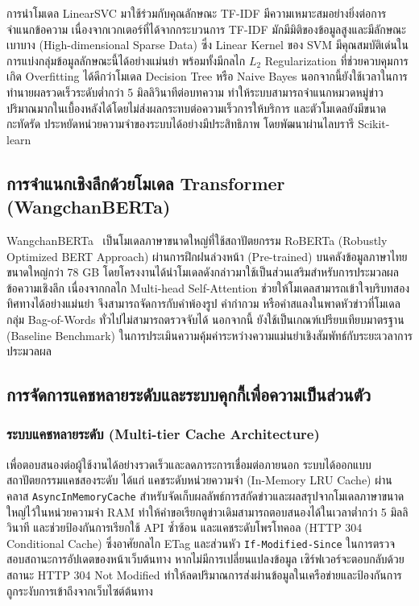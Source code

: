 การนำโมเดล LinearSVC มาใช้ร่วมกับคุณลักษณะ TF-IDF มีความเหมาะสมอย่างยิ่งต่อการจำแนกข้อความ เนื่องจากเวกเตอร์ที่ได้จากกระบวนการ TF-IDF มักมีมิติของข้อมูลสูงและมีลักษณะเบาบาง (High-dimensional Sparse Data) ซึ่ง Linear Kernel ของ SVM มีคุณสมบัติเด่นในการแบ่งกลุ่มข้อมูลลักษณะนี้ได้อย่างแม่นยำ พร้อมทั้งมีกลไก $L_2$ Regularization ที่ช่วยควบคุมการเกิด Overfitting ได้ดีกว่าโมเดล Decision Tree หรือ Naive Bayes นอกจากนี้ยังใช้เวลาในการทำนายผลรวดเร็วระดับต่ำกว่า 5 มิลลิวินาทีต่อบทความ ทำให้ระบบสามารถจำแนกหมวดหมู่ข่าวปริมาณมากในเบื้องหลังได้โดยไม่ส่งผลกระทบต่อความเร็วการให้บริการ และตัวโมเดลยังมีขนาดกะทัดรัด ประหยัดหน่วยความจำของระบบได้อย่างมีประสิทธิภาพ โดยพัฒนาผ่านไลบรารี Scikit-learn~\parencite{scikit2024}

\subsection{การจำแนกเชิงลึกด้วยโมเดล Transformer (WangchanBERTa)}

WangchanBERTa~\parencite{wangchanberta2021} เป็นโมเดลภาษาขนาดใหญ่ที่ใช้สถาปัตยกรรม RoBERTa (Robustly Optimized BERT Approach) ผ่านการฝึกฝนล่วงหน้า (Pre-trained) บนคลังข้อมูลภาษาไทยขนาดใหญ่กว่า 78 GB โดยโครงงานได้นำโมเดลดังกล่าวมาใช้เป็นส่วนเสริมสำหรับการประมวลผลข้อความเชิงลึก เนื่องจากกลไก Multi-head Self-Attention ช่วยให้โมเดลสามารถเข้าใจบริบทสองทิศทางได้อย่างแม่นยำ จึงสามารถจัดการกับคำพ้องรูป คำกำกวม หรือคำสแลงในพาดหัวข่าวที่โมเดลกลุ่ม Bag-of-Words ทั่วไปไม่สามารถตรวจจับได้ นอกจากนี้ ยังใช้เป็นเกณฑ์เปรียบเทียบมาตรฐาน (Baseline Benchmark) ในการประเมินความคุ้มค่าระหว่างความแม่นยำเชิงสัมพัทธ์กับระยะเวลาการประมวลผล

\subsection{การจัดการแคชหลายระดับและระบบคุกกี้เพื่อความเป็นส่วนตัว}

\subsubsection{ระบบแคชหลายระดับ (Multi-tier Cache Architecture)}
เพื่อตอบสนองต่อผู้ใช้งานได้อย่างรวดเร็วและลดภาระการเชื่อมต่อภายนอก ระบบได้ออกแบบสถาปัตยกรรมแคชสองระดับ ได้แก่ แคชระดับหน่วยความจำ (In-Memory LRU Cache) ผ่านคลาส \texttt{AsyncInMemoryCache} สำหรับจัดเก็บผลลัพธ์การสกัดข่าวและผลสรุปจากโมเดลภาษาขนาดใหญ่ไว้ในหน่วยความจำ RAM ทำให้คำขอเรียกดูข่าวเดิมสามารถตอบสนองได้ในเวลาต่ำกว่า 5 มิลลิวินาที และช่วยป้องกันการเรียกใช้ API ซ้ำซ้อน และแคชระดับโพรโทคอล (HTTP 304 Conditional Cache) ซึ่งอาศัยกลไก ETag และส่วนหัว \texttt{If-Modified-Since} ในการตรวจสอบสถานะการอัปเดตของหน้าเว็บต้นทาง หากไม่มีการเปลี่ยนแปลงข้อมูล เซิร์ฟเวอร์จะตอบกลับด้วยสถานะ HTTP 304 Not Modified ทำให้ลดปริมาณการส่งผ่านข้อมูลในเครือข่ายและป้องกันการถูกระงับการเข้าถึงจากเว็บไซต์ต้นทาง

